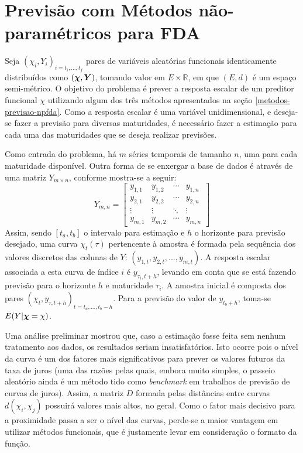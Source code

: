 \documentclass[
	12pt,				%
	openright,			%
	oneside,			%
	a4paper,			%
	english,			%
	brazil				%
	]{dissertacao-ufrgs-abntex2}
\begin{document}
\section{Previsão com Métodos não-paramétricos para FDA}

Seja $(\chi_i,Y_i)_{i=t_i,...,t_f}$ pares de variáveis aleatórias funcionais identicamente distribuídos como $(\boldsymbol{\chi},\boldsymbol{Y})$, tomando valor em $E \times \mathbb{R}$, em que $(E,d)$ é um espaço semi-métrico. O objetivo do problema é prever a resposta escalar de um preditor funcional $\chi$ utilizando algum dos três métodos apresentados na seção \ref{metodos-previsao-npfda}. Como a resposta escalar é uma variável unidimensional, e deseja-se fazer a previsão para diversas maturidades, é necessário fazer a estimação para cada uma das maturidades que se deseja realizar previsões.

Como entrada do problema, há $m$ séries temporais de tamanho $n$, uma para cada maturidade disponível. Outra forma de se enxergar a base de dados é através de uma matriz $Y_{m \times n}$, conforme mostra-se a seguir:
\begin{equation} 
Y_{m,n} = 
 \begin{bmatrix}
	  y_{1,1} & y_{1,2} & \cdots & y_{1,n} \\
	  y_{2,1} & y_{2,2} & \cdots & y_{2,n} \\
	  \vdots  & \vdots  & \ddots & \vdots  \\
	  y_{m,1} & y_{m,2} & \cdots & y_{m,n}
 \end{bmatrix}
\end{equation}
Assim, sendo $[t_a,t_b]$ o intervalo para estimação e $h$ o horizonte para previsão desejado, uma  curva $\chi_t(\tau)$ pertencente à amostra é formada pela sequência dos valores discretos das colunas de $Y$: $(y_{1,t},y_{2,t}, ... , y_{m,t})$. A resposta escalar associada a esta curva de índice $i$ é $y_{\tau_i,t + h}$, levando em conta que se está fazendo previsão para o horizonte $h$ e maturidade $\tau_i$. A amostra inicial é composta dos pares $(\chi_t,y_{\tau,t+h})_{t=t_a,...,t_b-h}$. Para a previsão do valor de $y_{t_b+h}$, toma-se $E(Y|\boldsymbol{\chi}=\chi)$. 

Uma análise preliminar mostrou que, caso a estimação fosse feita sem nenhum tratamento aos dados, os resultados seriam insatisfatórios. Isto ocorre pois o nível da curva é um dos fatores mais significativos para prever os valores futuros da taxa de juros (uma das razões pelas quais, embora muito simples, o passeio aleatório ainda é um método tido como \emph{benchmark} em trabalhos de previsão de curvas de juros). Assim, a matriz $D$ formada pelas distâncias entre curvas $d(\chi_i,\chi_j)$ possuirá valores mais altos, no geral. Como o fator mais decisivo para a proximidade passa a ser o nível das curvas, perde-se a maior vantagem em utilizar métodos funcionais, que é justamente levar em consideração o formato da função.
\end{document}
